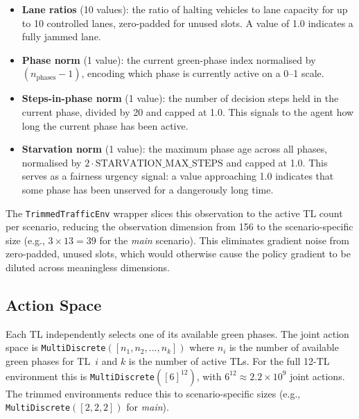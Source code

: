 \documentclass[12pt,oneside,a4paper]{report}
\begin{document}
\begin{itemize}[leftmargin=*]
  \item \textbf{Lane ratios} (10 values): the ratio of halting
        vehicles to lane capacity for up to 10 controlled lanes,
        zero-padded for unused slots.  A value of 1.0 indicates
        a fully jammed lane.

  \item \textbf{Phase norm} (1 value): the current green-phase
        index normalised by $(n_\text{phases} - 1)$, encoding
        which phase is currently active on a 0--1 scale.

  \item \textbf{Steps-in-phase norm} (1 value): the number of
        decision steps held in the current phase, divided by 20
        and capped at 1.0.  This signals to the agent how long the
        current phase has been active.

  \item \textbf{Starvation norm} (1 value): the maximum phase age
        across all phases, normalised by
        $2 \cdot \text{STARVATION\_MAX\_STEPS}$ and capped at 1.0.
        This serves as a fairness urgency signal: a value approaching
        1.0 indicates that some phase has been unserved for a
        dangerously long time.
\end{itemize}

The \texttt{TrimmedTrafficEnv} wrapper slices this observation to
the active TL count per scenario, reducing the observation dimension
from 156 to the scenario-specific size (e.g., $3 \times 13 = 39$
for the \textit{main} scenario).  This eliminates gradient noise
from zero-padded, unused slots, which would otherwise cause the
policy gradient to be diluted across meaningless dimensions.

\subsection{Action Space}

Each TL independently selects one of its available green phases.
The joint action space is \texttt{MultiDiscrete}$([n_1, n_2, \ldots,
n_k])$ where $n_i$ is the number of available green phases for
TL~$i$ and $k$ is the number of active TLs.  For the full 12-TL
environment this is \texttt{MultiDiscrete}$([6]^{12})$, with
$6^{12} \approx 2.2 \times 10^9$ joint actions.  The trimmed
environments reduce this to scenario-specific sizes
(e.g., \texttt{MultiDiscrete}$([2,2,2])$ for \textit{main}).
\end{document}
